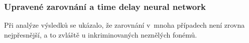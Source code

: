 \subsubsection{Upravené zarovnání a time delay neural network}

Při analýze výsledků se ukázalo, že zarovnání v~mnoha případech není zrovna nejpřesnější, a to zvláště u inkriminovaných neznělých fonémů.



